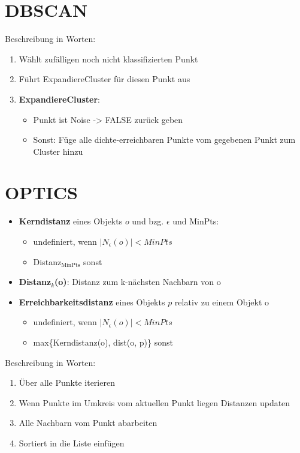 \documentclass{article}
\begin{document}
\section{DBSCAN}
Beschreibung in Worten:
\begin{enumerate}
    \item Wählt zufälligen noch nicht klassifizierten Punkt
    \item Führt ExpandiereCluster für diesen Punkt aus
    \item \textbf{ExpandiereCluster}:
    \begin{itemize}
        \item Punkt ist Noise -> FALSE zurück geben
        \item Sonst: Füge alle dichte-erreichbaren Punkte vom gegebenen
        Punkt zum Cluster hinzu
    \end{itemize}
\end{enumerate}
\section{OPTICS}
\begin{itemize}
    \item \textbf{Kerndistanz} eines Objekts $o$ und bzg. $\epsilon$ und MinPts:
    \begin{itemize}
        \item undefiniert, wenn $|N_{\epsilon}(o)| < MinPts$
        \item Distanz$_{\text{MinPts}}$ sonst
    \end{itemize}
    \item \textbf{Distanz$_k$(o)}: Distanz zum k-nächsten
    Nachbarn von o
    \item \textbf{Erreichbarkeitsdistanz} eines Objekts $p$
    relativ zu einem Objekt o
    \begin{itemize}
        \item undefiniert, wenn $|N_{\epsilon}(o)| < MinPts$
        \item max\{Kerndistanz(o), dist(o, p)\} sonst
    \end{itemize}
\end{itemize}
Beschreibung in Worten: 
\begin{enumerate}
    \item Über alle Punkte iterieren
    \item Wenn Punkte im Umkreis vom aktuellen Punkt liegen Distanzen updaten
    \item Alle Nachbarn vom Punkt abarbeiten
    \item Sortiert in die Liste einfügen
\end{enumerate}
\end{document}
